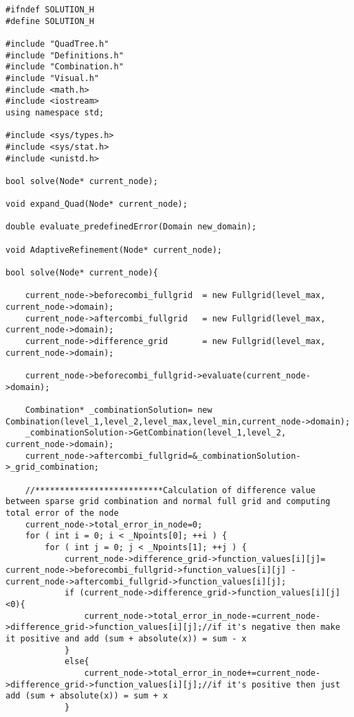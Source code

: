  \lstset{language=C++}
\begin{lstlisting}[caption= Source code for solution, label=code:sol]
#ifndef SOLUTION_H
#define SOLUTION_H

#include "QuadTree.h"
#include "Definitions.h"
#include "Combination.h"
#include "Visual.h"
#include <math.h>
#include <iostream>
using namespace std;

#include <sys/types.h>
#include <sys/stat.h>
#include <unistd.h>

bool solve(Node* current_node);

void expand_Quad(Node* current_node);

double evaluate_predefinedError(Domain new_domain);

void AdaptiveRefinement(Node* current_node);

bool solve(Node* current_node){

	current_node->beforecombi_fullgrid	= new Fullgrid(level_max, current_node->domain);
	current_node->aftercombi_fullgrid	= new Fullgrid(level_max, current_node->domain);
	current_node->difference_grid		= new Fullgrid(level_max, current_node->domain);

	current_node->beforecombi_fullgrid->evaluate(current_node->domain);

	Combination* _combinationSolution= new Combination(level_1,level_2,level_max,level_min,current_node->domain);
	_combinationSolution->GetCombination(level_1,level_2, current_node->domain);
	current_node->aftercombi_fullgrid=&_combinationSolution->_grid_combination;

	//**************************Calculation of difference value between sparse grid combination and normal full grid and computing total error of the node
	current_node->total_error_in_node=0;
	for ( int i = 0; i < _Npoints[0]; ++i ) {
		for ( int j = 0; j < _Npoints[1]; ++j ) {
			current_node->difference_grid->function_values[i][j]= current_node->beforecombi_fullgrid->function_values[i][j] - current_node->aftercombi_fullgrid->function_values[i][j];
			if (current_node->difference_grid->function_values[i][j]<0){
				current_node->total_error_in_node-=current_node->difference_grid->function_values[i][j];//if it's negative then make it positive and add (sum + absolute(x)) = sum - x
			}
			else{
				current_node->total_error_in_node+=current_node->difference_grid->function_values[i][j];//if it's positive then just add (sum + absolute(x)) = sum + x
			}


\end{lstlisting}
